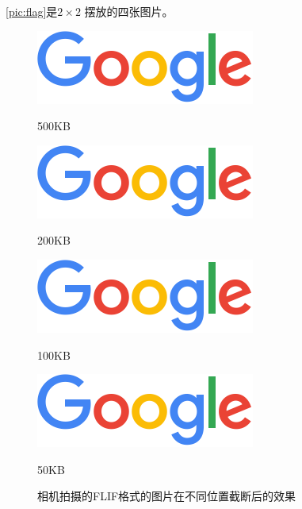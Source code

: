 \documentclass{dreamClass}
\begin{document}
\autoref{pic:flag}是\(2 \times 2\) 摆放的四张图片。
\begin{figure}
    \centering
    \begin{minipage}{.5\textwidth}
        \centering
        \includegraphics[width=\textwidth]{pic/screenshot.jpg}
        \caption{500KB}
    \end{minipage}%
    \begin{minipage}{.5\textwidth}
        \centering
        \includegraphics[width=\textwidth]{pic/screenshot.jpg}
        \caption{200KB}
    \end{minipage}

    \begin{minipage}{.5\textwidth}
        \centering
        \includegraphics[width=\textwidth]{pic/screenshot.jpg}
        \caption{100KB}
    \end{minipage}%
    \begin{minipage}{.5\textwidth}
        \centering
        \includegraphics[width=\textwidth]{pic/screenshot.jpg}
        \caption{50KB}
    \end{minipage}
    \caption{相机拍摄的FLIF格式的图片在不同位置截断后的效果\label{pic:flag}}
\end{figure}
\end{document}

